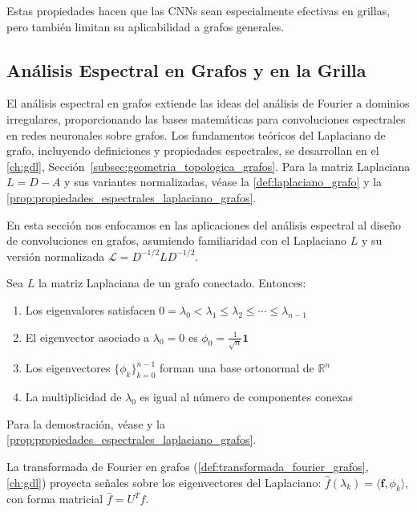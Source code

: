 Estas propiedades hacen que las CNNs sean especialmente efectivas en grillas, pero también limitan su aplicabilidad a grafos generales.

\subsection{Análisis Espectral en Grafos y en la Grilla}\label{subsec:analisis_espectral_grafos}

El análisis espectral en grafos extiende las ideas del análisis de Fourier a dominios irregulares, proporcionando las bases matemáticas para convoluciones espectrales en redes neuronales sobre grafos. Los fundamentos teóricos del Laplaciano de grafo, incluyendo definiciones y propiedades espectrales, se desarrollan en el \autoref{ch:gdl}, Sección~\ref{subsec:geometria_topologica_grafos}. Para la matriz Laplaciana $L = D - A$ y sus variantes normalizadas, véase la \autoref{def:laplaciano_grafo} y la \autoref{prop:propiedades_espectrales_laplaciano_grafos}.

En esta sección nos enfocamos en las aplicaciones del análisis espectral al diseño de convoluciones en grafos, asumiendo familiaridad con el Laplaciano $L$ y su versión normalizada $\mathcal{L} = D^{-1/2} L D^{-1/2}$.

\begin{theorem}\label{thm:espectral_laplaciano}
Sea $L$ la matriz Laplaciana de un grafo conectado. Entonces:
\begin{enumerate}
    \item Los eigenvalores satisfacen $0 = \lambda_0 < \lambda_1 \leq \lambda_2 \leq \cdots \leq \lambda_{n-1}$
    \item El eigenvector asociado a $\lambda_0 = 0$ es $\phi_0 = \frac{1}{\sqrt{n}} \mathbf{1}$
    \item Los eigenvectores $\{\phi_k\}_{k=0}^{n-1}$ forman una base ortonormal de $\mathbb{R}^n$
    \item La multiplicidad de $\lambda_0$ es igual al número de componentes conexas
\end{enumerate}
Para la demostración, véase \citep[Capítulos~1--2]{Chung1997} y la \autoref{prop:propiedades_espectrales_laplaciano_grafos}.
\end{theorem}

La transformada de Fourier en grafos (\autoref{def:transformada_fourier_grafos}, \autoref{ch:gdl}) proyecta señales sobre los eigenvectores del Laplaciano: $\hat{f}(\lambda_k) = \langle \mathbf{f}, \phi_k \rangle$, con forma matricial $\hat{f} = U^T f$.

